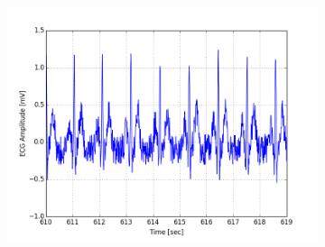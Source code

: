 \documentclass[paper=a4, fontsize=11pt]{scrartcl}
\numberwithin{equation}{section}		%
\numberwithin{figure}{section}			%
\numberwithin{table}{section}		    %
\begin{document}
\begin{appendices}
\begin{figure}[H]
\begin{subfigure}[b]{0.3\textwidth}
		\includegraphics[width=\textwidth]{sim/ecg_15}
	\end{subfigure}
\end{figure}


\end{appendices}
\end{document}

